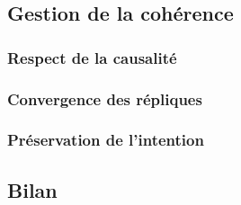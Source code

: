 \subsection{Gestion de la cohérence}


\subsubsection{Respect de la causalité}
\subsubsection{Convergence des répliques}
\subsubsection{Préservation de l'intention}
\subsection{Bilan}